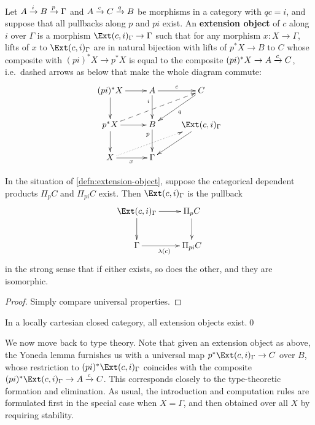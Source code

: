 \documentclass{amsart}
\begin{document}
\begin{defn}\label{defn:extension-object}
  Let $A\xrightarrow{i} B \xrightarrow{p} \Gamma$ and $A\xrightarrow{c} C\xrightarrow{q} B$ be morphisms in a category with $q c = i$, and suppose that all pullbacks along $p$ and $pi$ exist.
  An \textbf{extension object} of $c$ along $i$ over $\Gamma$ is a morphism $\Ext(c,i)_\Gamma \to \Gamma$ such that for any morphism $x:X\to \Gamma$, lifts of $x$ to $\Ext(c,i)_\Gamma$ are in natural bijection with lifts of $p^*X \to B$ to $C$ whose composite with $(pi)^*X \to p^*X$ is equal to the composite $(pi)^*X \to A \xrightarrow{c} C$, i.e.\ dashed arrows as below that make the whole diagram commute:
  \[ \xymatrix{
    (pi)^*X \ar[r] \ar[d] & A \ar[d]_(.3)i \ar[r]^c & C \ar[dl]^q\\
    p^*X \ar[d] \ar[r] \ar@{-->}[urr] & B \ar[d]_(.3)p & \Ext(c,i)_\Gamma \ar[dl] \\
    X \ar[r]_x \ar@{.>}[urr] & \Gamma
    } \]
\end{defn}

\begin{lem}
  In the situation of \cref{defn:extension-object}, suppose the categorical dependent products $\Pi_p C$ and $\Pi_{pi} C$ exist.
  Then $\Ext(c,i)_\Gamma$ is the pullback
  \begin{equation}
    \vcenter{\xymatrix{
        \Ext(c,i)_\Gamma \ar[r]\ar[d] &
        \Pi_p C\ar[d]\\
        \Gamma \ar[r]_{\lambda(c)} &
        \Pi_{pi} C
      }}
  \end{equation}
  in the strong sense that if either exists, so does the other, and they are isomorphic.
\end{lem}
\begin{proof}
  Simply compare universal properties.
\end{proof}

\begin{cor}
  In a locally cartesian closed category, all extension objects exist.\qed
\end{cor}

We now move back to type theory.
Note that given an extension object as above, the Yoneda lemma furnishes us with a universal map $p^*\Ext(c,i)_\Gamma \to C$ over $B$, whose restriction to $(pi)^*\Ext(c,i)_\Gamma$ coincides with the composite $(pi)^*\Ext(c,i)_\Gamma \to A \xto{c} C$.
This corresponds closely to the type-theoretic formation and elimination.
As usual, the introduction and computation rules are formulated first in the special case when $X=\Gamma$, and then obtained over all $X$ by requiring stability.
\end{document}
